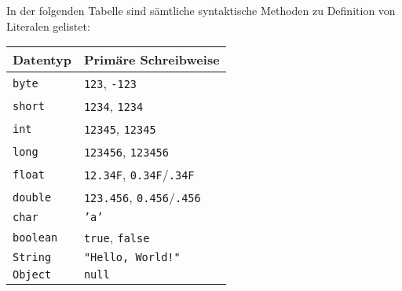 	In der folgenden Tabelle sind sämtliche syntaktische Methoden zu Definition von Literalen gelistet:
	\begin{table}[H]
		\centering
		\begin{tabular}{l | l}
			Datentyp         & Primäre Schreibweise \\
			\hline
			\texttt{byte}    & \texttt{123}, \texttt{-123} \\
			\texttt{short}   & \texttt{1234}, \texttt{1234} \\
			\texttt{int}     & \texttt{12345}, \texttt{12345} \\
			\texttt{long}    & \texttt{123456}, \texttt{123456} \\
			\texttt{float}   & \texttt{12.34F}, \texttt{0.34F}/\texttt{.34F} \\
			\texttt{double}  & \texttt{123.456}, \texttt{0.456}/\texttt{.456} \\
			\texttt{char}    & \texttt{'a'} \\
			\texttt{boolean} & \texttt{true}, \texttt{false} \\
			\texttt{String}  & \texttt{"Hello, World!"} \\
			\texttt{Object}  & \texttt{null} \\
		\end{tabular}
	\end{table}
	
